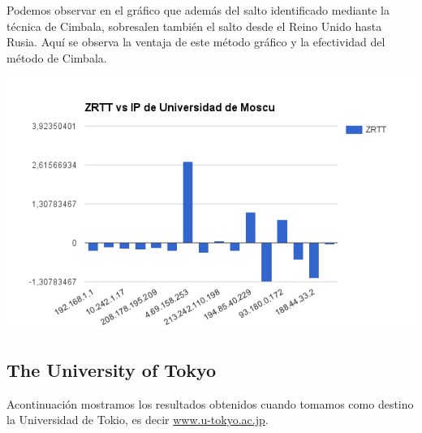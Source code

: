 Podemos observar en el gráfico que además del salto identificado mediante la técnica de Cimbala, sobresalen también el salto desde el Reino Unido hasta Rusia. Aquí se observa la ventaja de este método gráfico y la efectividad del método de Cimbala.

\begin{center}
\includegraphics[width=\textwidth]{imgs/moscu.png}
\end{center}


\subsection{The University of Tokyo}
Acontinuación mostramos los resultados obtenidos cuando tomamos como destino la
Universidad de Tokio, es decir \url{www.u-tokyo.ac.jp}.

